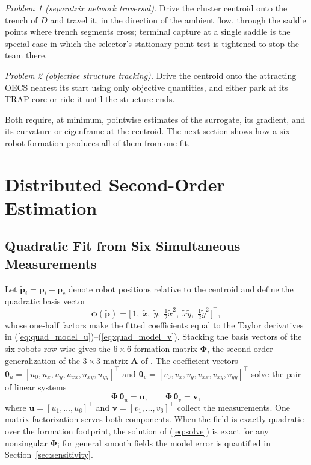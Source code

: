 \documentclass[lettersize,journal]{IEEEtran}
\begin{document}
\emph{Problem 1 (separatrix network traversal).} Drive the cluster
centroid onto the trench of $D$ and travel it, in the direction of the
ambient flow, through the saddle points where trench segments cross;
terminal capture at a single saddle is the special case in which the
selector's stationary-point test is tightened to stop the team there.

\emph{Problem 2 (objective structure tracking).} Drive the centroid
onto the attracting OECS nearest its start using only objective
quantities, and either park at its TRAP core or ride it until the
structure ends.

Both require, at minimum, pointwise estimates of the surrogate, its
gradient, and its curvature or eigenframe at the centroid. The next
section shows how a six-robot formation produces all of them from one
fit.


\section{Distributed Second-Order Estimation}
\label{sec:estimation}

\subsection{Quadratic Fit from Six Simultaneous Measurements}

Let $\tilde{\mathbf{p}}_i = \mathbf{p}_i - \mathbf{p}_c$ denote robot
positions relative to the centroid and define the quadratic basis vector
\begin{equation}
    \boldsymbol{\phi}(\tilde{\mathbf{p}}) =
    \bigl[\,1, \; \tilde{x}, \; \tilde{y}, \; \tfrac{1}{2}\tilde{x}^2, \;
    \tilde{x}\tilde{y}, \; \tfrac{1}{2}\tilde{y}^2\,\bigr]^\top,
    \label{eq:basis}
\end{equation}
whose one-half factors make the fitted coefficients equal to the Taylor
derivatives in (\ref{eq:quad_model_u})--(\ref{eq:quad_model_v}). Stacking
the basis vectors of the six robots row-wise gives the $6 \times 6$
formation matrix $\boldsymbol{\Phi}$, the second-order generalization of
the $3 \times 3$ matrix $\mathbf{A}$ of \cite{14}. The coefficient vectors
$\boldsymbol{\theta}_u = [u_0, u_x, u_y, u_{xx}, u_{xy}, u_{yy}]^\top$ and
$\boldsymbol{\theta}_v = [v_0, v_x, v_y, v_{xx}, v_{xy}, v_{yy}]^\top$
solve the pair of linear systems
\begin{equation}
    \boldsymbol{\Phi}\,\boldsymbol{\theta}_u = \mathbf{u}, \qquad
    \boldsymbol{\Phi}\,\boldsymbol{\theta}_v = \mathbf{v},
    \label{eq:solve}
\end{equation}
where $\mathbf{u} = [u_1, \ldots, u_6]^\top$ and $\mathbf{v} = [v_1,
\ldots, v_6]^\top$ collect the measurements. One matrix factorization
serves both components. When the field is exactly quadratic over the
formation footprint, the solution of (\ref{eq:solve}) is exact for any
nonsingular $\boldsymbol{\Phi}$; for general smooth fields the model
error is quantified in Section~\ref{sec:sensitivity}.
\end{document}
